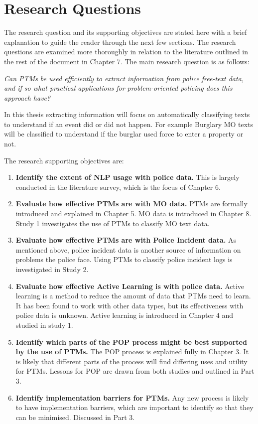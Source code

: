 \section{Research Questions}

The research question and its supporting objectives are stated here with a brief explanation to guide the reader through the next few sections. The research questions are examined more thoroughly in relation to the literature outlined in the rest of the document in Chapter 7. The main research question is as follows:


\emph{Can PTMs be used efficiently to extract information from police free-text data, and if so what practical applications for problem-oriented policing does this approach have?}


In this thesis extracting information will focus on automatically classifying texts to understand if an event did or did not happen. For example Burglary MO texts will be classified to understand if the burglar used force to enter a property or not.

The research supporting objectives are:

\begin{enumerate}
\item {\bf Identify the extent of NLP usage with police data.} This is largely conducted in the literature survey, which is the focus of Chapter 6.

\item {\bf Evaluate how effective PTMs are with MO data.} PTMs are formally introduced and explained in Chapter 5. MO data is introduced in Chapter 8. Study 1 investigates the use of PTMs to classify MO text data.

\item {\bf Evaluate how effective PTMs are with Police Incident data.} As mentioned above, police incident data is another source of information on problems the police face. Using PTMs to classify police incident logs is investigated in Study 2.

\item {\bf Evaluate how effective Active Learning is with police data.}  Active learning is a method to reduce the amount of data that PTMs need to learn. It has been found to work with other data types, but its effectiveness with police data is unknown. Active learning is introduced in Chapter 4 and studied in study 1.

\item {\bf Identify which parts of the POP process might be best supported by the use of PTMs.} The POP process is explained fully in Chapter 3. It is likely that different parts of the process will find differing uses and utility for PTMs. Lessons for POP are drawn from both studies and outlined in Part 3.

\item {\bf Identify implementation barriers for PTMs.} Any new process is likely to have implementation barriers, which are important to identify so that they can be minimised. Discussed in Part 3.
\end{enumerate}



